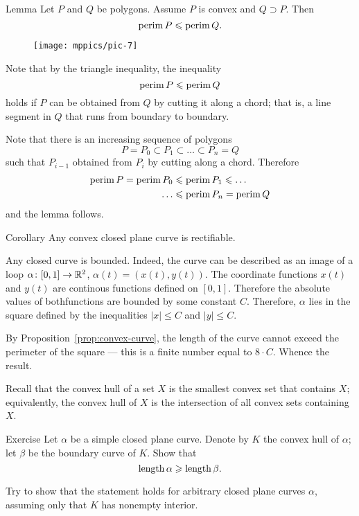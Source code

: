 \begin{thm}{Lemma}\label{lem:perimeter}
Let $P$ and $Q$ be polygons.
Assume $P$ is convex and $Q\supset P$.
Then 
\[\mathop{\rm perim}\nolimits P\leqslant \mathop{\rm perim}\nolimits Q.\]

\end{thm}


\begin{wrapfigure}{o}{24 mm}
\vskip-2mm
\centering
\texttt{[image: mppics/pic-7]}
\vskip2mm
\end{wrapfigure}

Note that by the triangle inequality,
the inequality
\[\mathop{\rm perim}\nolimits P\leqslant \mathop{\rm perim}\nolimits Q\]
holds
if $P$ can be obtained from $Q$ by cutting it along a chord;
that is, a line segment in $Q$ that runs from boundary to boundary.

Note that there is an increasing sequence of polygons 
$$P=P_0\subset P_1\subset\dots\subset P_n=Q$$
such that $P_{i-1}$ obtained from $P_{i}$ by cutting along a chord.
Therefore 
\begin{align*}
\mathop{\rm perim}\nolimits P=\mathop{\rm perim}\nolimits P_0&\leqslant\mathop{\rm perim}\nolimits P_1\leqslant\dots
\\
\dots&\leqslant\mathop{\rm perim}\nolimits P_n=\mathop{\rm perim}\nolimits Q
\end{align*}
and the lemma follows.
\qeds

\begin{thm}{Corollary}\label{cor:convex=>rectifiable}
Any convex closed plane curve is rectifiable.  
\end{thm}

Any closed curve is bounded.
Indeed, the curve can be described as an image of a loop $\alpha\colon[0,1]\to\mathbb{R}^2$, $\alpha(t)=(x(t),y(t))$.
The coordinate functions $x(t)$ and $y(t)$ are continous functions defined on $[0,1]$.
Therefore the absolute values of bothfunctions are bounded by some constant $C$.
Therefore, $\alpha$ lies in the square defined by the inequalities $|x|\le C$ and $|y|\le C$.


By Proposition~\ref{prop:convex-curve}, the length of the curve cannot exceed the perimeter of the square --- this is a finite number equal to $8\cdot C$. 
Whence the result.
\qeds

Recall that the convex hull of a set $X$ is the smallest convex set that contains $X$; equivalently, the convex hull of $X$ is the intersection of all convex sets containing $X$.

\begin{thm}{Exercise}\label{ex:convex-hull}
Let $\alpha$ be a simple closed plane curve.
Denote by $K$ the convex hull of $\alpha$; let $\beta$ be the boundary curve of $K$.
Show that 
\[\mathop{\rm length}\nolimits \alpha\geqslant \mathop{\rm length}\nolimits \beta.\]

Try to show that the statement holds for arbitrary closed plane curves $\alpha$, assuming only that $K$ has nonempty interior.
\end{thm}


